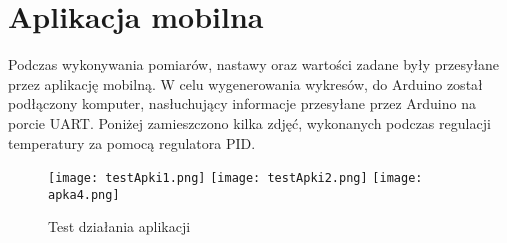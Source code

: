 \section{Aplikacja mobilna}
Podczas wykonywania pomiarów, nastawy oraz wartości zadane były przesyłane przez aplikację mobilną. W celu wygenerowania wykresów, do Arduino został podłączony komputer, nasłuchujący informacje przesyłane przez Arduino na porcie UART. Poniżej zamieszczono kilka zdjęć, wykonanych podczas regulacji temperatury za pomocą regulatora PID.
\begin{figure}[H]
	\centering
	\texttt{[image: testApki1.png]}
	\texttt{[image: testApki2.png]}
	\texttt{[image: apka4.png]}
	\caption{Test działania aplikacji}
\end{figure}